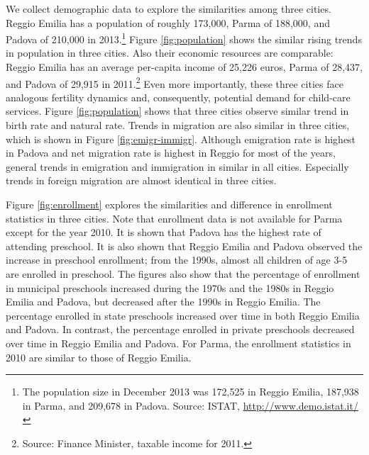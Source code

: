 We collect demographic data to explore the similarities among three cities. Reggio Emilia has a population of roughly 173,000, Parma of 188,000, and Padova of 210,000 in 2013.\footnote{The population size in December 2013 was 172,525 in Reggio Emilia, 187,938 in Parma, and 209,678 in Padova. Source: ISTAT, \url{http://www.demo.istat.it/}} Figure \ref{fig:population} shows the similar rising trends in population in three cities. Also their economic resources are comparable: Reggio Emilia has an average per-capita income of 25,226 euros, Parma of 28,437, and Padova of 29,915 in 2011.\footnote{Source: Finance Minister, taxable income for 2011.} 
Even more importantly, these three cities face analogous fertility dynamics and, consequently, potential demand for child-care services. Figure \ref{fig:population} shows that three cities observe similar trend in birth rate and natural rate. Trends in migration are also similar in three cities, which is shown in Figure \ref{fig:emigr-immigr}. Although emigration rate is highest in Padova and net migration rate is highest in Reggio for most of the years, general trends in emigration and immigration in similar in all cities. Especially trends in foreign migration are almost identical in three cities.    

Figure \ref{fig:enrollment} explores the similarities and difference in enrollment statistics in three cities. Note that enrollment data is not available for Parma except for the year 2010. It is shown that Padova has the highest rate of attending preschool. It is also shown that Reggio Emilia and Padova observed the increase in preschool enrollment; from the 1990s, almost all children of age 3-5 are enrolled in preschool. The figures also show that the percentage of enrollment in municipal preschools increased during the 1970s and the 1980s in Reggio Emilia and Padova, but decreased after the 1990s in Reggio Emilia. The percentage enrolled in state preschools increased over time in both Reggio Emilia and Padova. In contrast, the percentage enrolled in private preschools decreased over time in Reggio Emilia and Padova. For Parma, the enrollment statistics in 2010 are similar to those of Reggio Emilia. 
 
